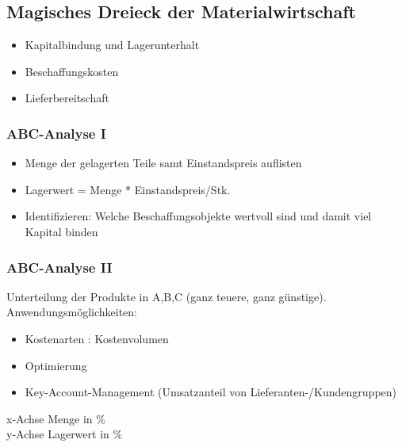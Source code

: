 \documentclass[../ZF_Wing.tex]{subfiles}
\begin{document}
\subsection{Magisches Dreieck der Materialwirtschaft}
\begin{itemize}
	\item Kapitalbindung und Lagerunterhalt
	\item Beschaffungskosten
	\item Lieferbereitschaft

\end{itemize}

\subsubsection{ABC-Analyse I}
\begin{itemize}
	\item Menge der gelagerten Teile samt Einstandspreis auflisten
	\item Lagerwert = Menge *  Einstandspreis/Stk.
	\item Identifizieren: Welche Beschaffungsobjekte wertvoll sind und damit viel Kapital binden
\end{itemize}

\subsubsection{ABC-Analyse II}
Unterteilung der Produkte in A,B,C (ganz teuere, ganz günstige).\\
Anwendungsmöglichkeiten:
\begin{itemize}
	\item Kostenarten : Kostenvolumen
	\item Optimierung
	\item Key-Account-Management (Umsatzanteil von Lieferanten-/Kundengruppen)
\end{itemize}
x-Achse Menge in $\%$\\
y-Achse Lagerwert in $\%$\\
\end{document}
